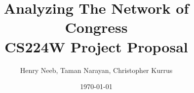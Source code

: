 \documentclass{article}
\title{Analyzing The Network of Congress \\
CS224W Project Proposal}
\author{Henry Neeb, Taman Narayan, Christopher Kurrus}
\date{\today}
\begin{document}
\maketitle






{\small


}
\end{document}

